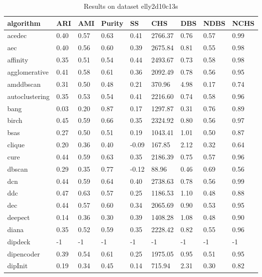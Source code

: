 \begin{table}[H]
\centering
\caption{Results on dataset elly2d10c13s}
\label{tab:params:elly2d10c13s}
\begin{tabular}{|l|l|l|l|l|l|l|l|l|}
\hline
algorithm & ARI & AMI & Purity & SS & CHS & DBS & NDBS & NCHS \\
\hline
acedec & 0.40 & 0.57 & 0.63 & 0.41 & 2766.37 & 0.76 & 0.57 & 0.99 \\
\hline
aec & 0.40 & 0.56 & 0.60 & 0.39 & 2675.84 & 0.81 & 0.55 & 0.98 \\
\hline
affinity & 0.35 & 0.51 & 0.54 & 0.44 & 2493.67 & 0.73 & 0.58 & 0.98 \\
\hline
agglomerative & 0.41 & 0.58 & 0.61 & 0.36 & 2092.49 & 0.78 & 0.56 & 0.95 \\
\hline
amddbscan & 0.31 & 0.50 & 0.48 & 0.21 & 370.96 & 4.98 & 0.17 & 0.74 \\
\hline
autoclustering & 0.35 & 0.53 & 0.54 & 0.41 & 2216.60 & 0.74 & 0.58 & 0.96 \\
\hline
bang & 0.03 & 0.20 & 0.87 & 0.17 & 1297.87 & 0.31 & 0.76 & 0.89 \\
\hline
birch & 0.45 & 0.59 & 0.66 & 0.35 & 2324.92 & 0.80 & 0.56 & 0.97 \\
\hline
bsas & 0.27 & 0.50 & 0.51 & 0.19 & 1043.41 & 1.01 & 0.50 & 0.87 \\
\hline
clique & 0.20 & 0.36 & 0.40 & -0.09 & 167.85 & 2.12 & 0.32 & 0.64 \\
\hline
cure & 0.44 & 0.59 & 0.63 & 0.35 & 2186.39 & 0.75 & 0.57 & 0.96 \\
\hline
dbscan & 0.29 & 0.35 & 0.77 & -0.12 & 88.96 & 0.46 & 0.69 & 0.56 \\
\hline
dcn & 0.44 & 0.59 & 0.64 & 0.40 & 2738.63 & 0.78 & 0.56 & 0.99 \\
\hline
ddc & 0.47 & 0.63 & 0.57 & 0.25 & 1186.53 & 1.10 & 0.48 & 0.88 \\
\hline
dec & 0.44 & 0.57 & 0.60 & 0.34 & 2065.69 & 0.90 & 0.53 & 0.95 \\
\hline
deepect & 0.14 & 0.36 & 0.30 & 0.39 & 1408.28 & 1.08 & 0.48 & 0.90 \\
\hline
diana & 0.35 & 0.52 & 0.59 & 0.35 & 2228.42 & 0.82 & 0.55 & 0.96 \\
\hline
dipdeck & -1 & -1 & -1 & -1 & -1 & -1 & -1 & -1 \\
\hline
dipencoder & 0.39 & 0.54 & 0.61 & 0.25 & 1975.05 & 0.95 & 0.51 & 0.95 \\
\hline
dipInit & 0.19 & 0.34 & 0.45 & 0.14 & 715.94 & 2.31 & 0.30 & 0.82 \\

\end{tabular}
\end{table}

